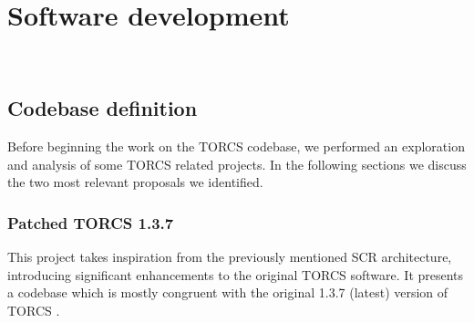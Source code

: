 \chapter{Software development}
\label{cap:development}

\\

\section{Codebase definition}
Before beginning the work on the TORCS codebase, we performed an exploration and analysis of some TORCS related projects. In the following sections we discuss the two most relevant proposals we identified.

\subsection{Patched TORCS 1.3.7}\label{patched-torcs}
This project takes inspiration from the previously mentioned SCR architecture, introducing significant enhancements to the original TORCS software. It presents a codebase which is mostly congruent with the original 1.3.7 (latest) version of TORCS \cite{site:patched-torcs}. 
